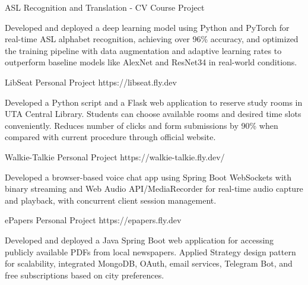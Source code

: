 \documentclass[10pt]{article}
\begin{document}
{        \project
        {ASL Recognition and Translation - CV}
        {Course Project}
        {}
        {\begin{newitemize}
            \item {Developed and deployed a deep learning model using Python and PyTorch for real-time ASL alphabet recognition, achieving over 96\% accuracy, and optimized the training pipeline with data augmentation and adaptive learning rates to outperform baseline models like AlexNet and ResNet34 in real-world conditions.}
	    \end{newitemize}}

        \project
        {LibSeat}
        {Personal Project}
        {https://libseat.fly.dev}
        {\begin{newitemize}
            \item {Developed a Python script and a Flask web application to reserve study rooms in UTA Central Library. Students can choose available rooms and desired time slots conveniently. Reduces number of clicks and form submissions by 90\% when compared with current procedure through official website.}
	    \end{newitemize}}
 

        \project
        {Walkie-Talkie}
        {Personal Project}
        {https://walkie-talkie.fly.dev/}
        {\begin{newitemize}
            \item Developed a browser-based voice chat app using Spring Boot WebSockets with binary streaming and Web Audio API/MediaRecorder for real-time audio capture and playback, with concurrent client session management.
        \end{newitemize}}

        \project
        {ePapers}
        {Personal Project}
        {https://epapers.fly.dev}
        {\begin{newitemize}
            \item {Developed and deployed a Java Spring Boot web application for accessing publicly available PDFs from local newspapers. Applied Strategy design pattern for scalability, integrated MongoDB, OAuth, email services, Telegram Bot, and free subscriptions based on city preferences.}
	\end{newitemize}}
 
}
\end{document}
